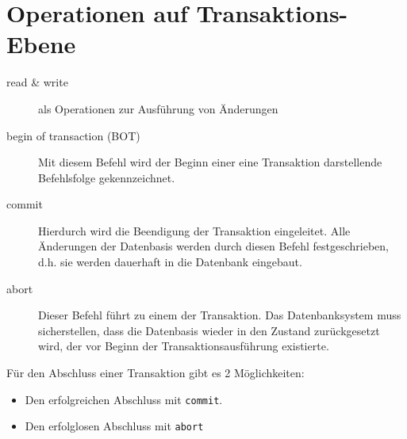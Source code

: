 \documentclass{lehramt-informatik-haupt}
\begin{document}
%

\section{Operationen auf Transaktions-Ebene}

\begin{liQuellen}
\item \cite[Seite 5]{db:fs:5}
\item \cite[Seite 211]{winter}
\item \cite[Kapitel 9.3, Seite 302-302]{kemper}

\end{liQuellen}

\begin{description}
\item[read \& write]

als Operationen zur Ausführung von Änderungen

\item[begin of transaction (BOT)]

Mit diesem Befehl wird der Beginn einer eine Transaktion darstellende
Befehlsfolge gekennzeichnet.

\item[commit]

Hierdurch wird die Beendigung der Transaktion eingeleitet. Alle
Änderungen der Datenbasis werden durch diesen Befehl festgeschrieben,
d.h. sie werden dauerhaft in die Datenbank eingebaut.

\item[abort]

Dieser Befehl führt zu einem  der Transaktion. Das
Datenbanksystem muss sicherstellen, dass die Datenbasis wieder in den
Zustand zurückgesetzt wird, der vor Beginn der Transaktionsausführung
existierte.
\end{description}

\noindent
Für den Abschluss einer Transaktion gibt es 2 Möglichkeiten:

\begin{itemize}
\item Den erfolgreichen Abschluss mit \texttt{commit}.
\item Den erfolglosen Abschluss mit \texttt{abort}
\end{itemize}

%
\end{document}
